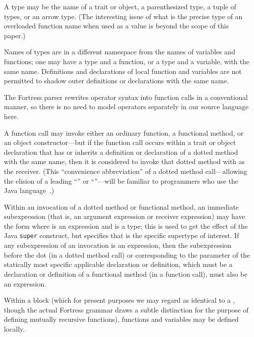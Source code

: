 A type may be the name of a trait or object, a parenthesized type, a
tuple of types, or an arrow type.  (The interesting issue of what is the
precise type of an overloaded function name when used as a value
is beyond the scope of this paper.)

Names of types are in a different namespace from the names
of variables and functions; one may have a type and a function, or a type and a variable,
with the same name.
Definitions and declarations of local function and variables are not permitted to shadow
outer definitions or declarations with the same name.

The Fortress parser rewrites operator syntax into function calls in a conventional manner,
so there is no need to model operators separately in our source language here.

A function call may invoke either an ordinary function, a functional method, or an object constructor---but
if the function call occurs within a trait
or object declaration that has or inherits a definition or declaration
of a dotted method with the same name, then it is considered to
invoke that dotted method with  as the receiver.
(This ``convenience abbreviation'' of a dotted method call---allowing the elision
of a leading ``'' or ``''---will
be familiar to programmers who use the Java language~\cite[\S 15.11]{JLS1}.)

Within an invocation of a dotted method or functional method,
an immediate subexpression (that is, an argument expression or receiver expression)
may have the form  where  is an expression and  is a type;
this is used to get the effect of the Java {\tt super} construct, but specifies
that  is the specific supertype of interest.  If any subexpression of an invocation
is an  expression, then the subexpression before the dot (in a dotted method call)
or corresponding to the  parameter of the statically most specific applicable declaration
or definition, which must be a declaration or definition of a functional method (in a function call),
must also be an  expression.

Within a block (which for present purposes we may regard as identical to
a , though the actual Fortress grammar draws a subtle distinction
for the purpose of defining mutually recursive functions),
functions and variables may be defined locally.

